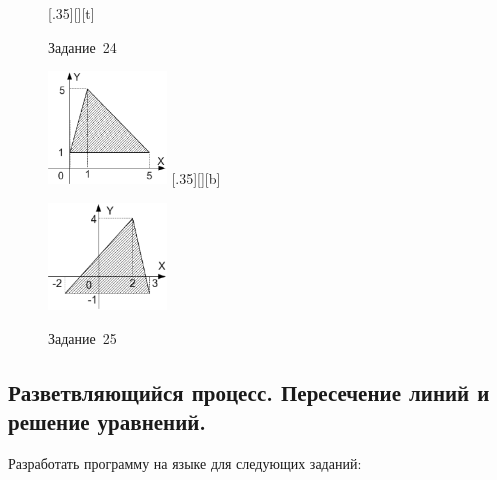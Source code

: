 \begin{figure}[h]
\begin{floatrow}
[.35\textwidth][\FBheight][t]
{\caption{Задание~24}
\label{ch03:refDrawing86}}
{\includegraphics[width=0.28\textwidth,keepaspectratio]{img/ris_3_87}}%
%
[.35\textwidth][\FBheight][b]
{\caption{Задание~25}
\label{ch03:refDrawing87}}
{\includegraphics[width=0.28\textwidth]{img/ris_3_88}}
\end{floatrow}
\end{figure}


\subsection[Разветвляющийся процесс. Пересечение линий и решение уравнений.]{Разветвляющийся процесс. Пересечение
линий и решение уравнений.}
Разработать программу на языке  для следующих заданий:

